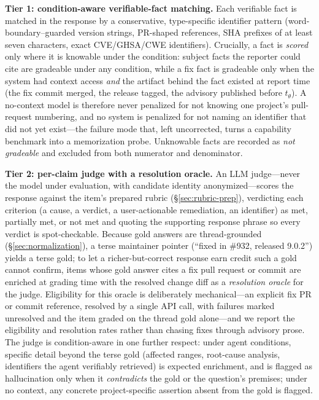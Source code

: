 \textbf{Tier 1: condition-aware verifiable-fact matching.}
Each verifiable fact is matched in the response by a conservative, type-specific
identifier pattern (word-boundary--guarded version strings, PR-shaped
references, SHA prefixes of at least seven characters, exact CVE/GHSA/CWE
identifiers). Crucially, a fact is \emph{scored} only where it is knowable
under the condition: subject facts the reporter could cite are gradeable under
any condition, while a fix fact is gradeable only when the system had context
access \emph{and} the artifact behind the fact existed at report time (the fix
commit merged, the release tagged, the advisory published before $t_\theta$).
A no-context model is therefore never penalized for not knowing one project's
pull-request numbering, and no system is penalized for not naming an
identifier that did not yet exist---the failure mode that, left uncorrected,
turns a capability benchmark into a memorization probe. Unknowable facts are
recorded as \emph{not gradeable} and excluded from both numerator and
denominator.

\textbf{Tier 2: per-claim judge with a resolution oracle.}
An LLM judge---never the model under evaluation, with candidate identity
anonymized---scores the response against the item's prepared rubric
(\S\ref{sec:rubric-prep}), verdicting each criterion (a cause, a verdict, a
user-actionable remediation, an identifier) as met, partially met, or not met
and quoting the supporting response phrase so every verdict is spot-checkable. Because gold
answers are thread-grounded (\S\ref{sec:normalization}), a terse maintainer
pointer (``fixed in \#932, released 9.0.2'') yields a terse gold; to let a
richer-but-correct response earn credit such a gold cannot confirm, items
whose gold answer cites a fix pull request or commit are enriched at grading
time with the resolved change diff as a \emph{resolution oracle} for the judge.
Eligibility for this oracle is deliberately mechanical---an explicit fix PR or
commit reference, resolved by a single API call, with failures marked
unresolved and the item graded on the thread gold alone---and we report the
eligibility and resolution rates rather than chasing fixes through advisory
prose. The judge is condition-aware in one further respect: under agent
conditions, specific detail beyond the terse gold (affected ranges, root-cause
analysis, identifiers the agent verifiably retrieved) is expected enrichment,
and is flagged as hallucination only when it \emph{contradicts} the gold or the
question's premises; under no context, any concrete project-specific assertion
absent from the gold is flagged.

